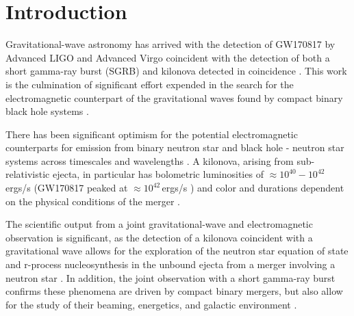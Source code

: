\documentclass[twocolumn]{aastex61}
\begin{document}

\section{Introduction}
\label{sec:Intro}

Gravitational-wave astronomy has arrived with the detection of GW170817 \citep{AbEA2017b} by Advanced LIGO \citep{aLIGO} and Advanced Virgo \citep{adVirgo} coincident with the detection of both a short gamma-ray burst (SGRB) \citep{AbEA2017c,AbEA2017d,AbEA2017e} and kilonova detected in coincidence \citep{AbEA2017f,AbEA2017g}. 
This work is the culmination of significant effort expended in the search for the electromagnetic counterpart of the gravitational waves found by compact binary black hole systems \citep{AbEA2016a,AbEA2016g,AbEA2017}.

There has been significant optimism for the potential electromagnetic counterparts for emission from binary neutron star and black hole - neutron star systems across timescales and wavelengths \citep{Nakar2007,MeBe2012}. 
A  kilonova, arising from sub-relativistic ejecta, in particular has bolometric luminosities of $\approx 10^{40}-10^{42}$\,ergs/s \citep{MeBa2015,BaKa2013} (GW170817 peaked at $\approx 10^{42}$\,ergs/s \citep{SmCh2017})
and color and durations dependent on the physical conditions of the merger \citep{MeMa2010,KaBa2013,BaKa2013,TaHo2013,KaFe2015,BaKa2016,Me2017}.

The scientific output from a joint gravitational-wave and electromagnetic observation is significant, as the detection of a kilonova coincident with a gravitational wave allows for the exploration of the neutron star equation of state \citep{BaBa2013} and r-process nucleosynthesis in the unbound ejecta from a merger involving a neutron star \citep{MeBa2015,JuBa2015,RoLi2017,WuFe2016}.
In addition, the joint observation with a short gamma-ray burst confirms these phenomena are driven by compact binary mergers, but also allow for the study of their beaming, energetics, and galactic environment \citep{MeBe2012}.
\end{document}
